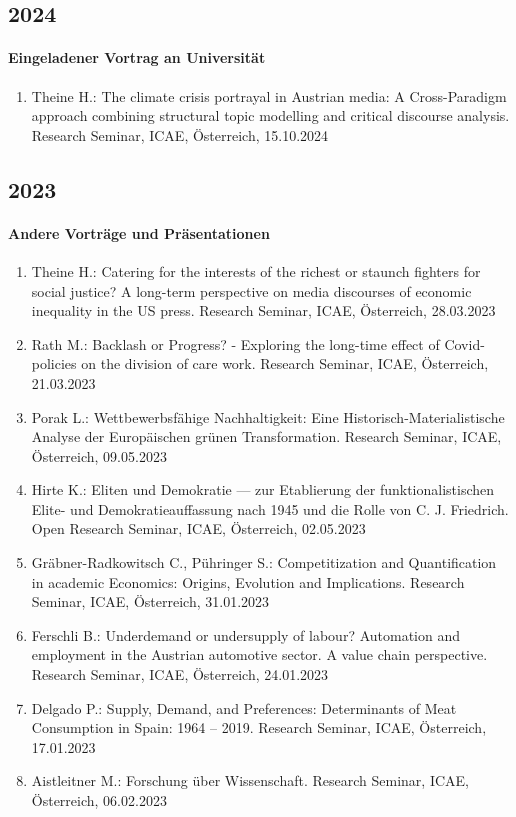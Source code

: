\subsection*{2024}

    \paragraph{Eingeladener Vortrag an Universität}
\begin{enumerate}
	\item Theine H.: The climate crisis portrayal in Austrian media:  A Cross-Paradigm approach combining structural topic modelling and critical discourse analysis. Research Seminar, ICAE, Österreich, 15.10.2024
\end{enumerate}
\subsection*{2023}

    \paragraph{Andere Vorträge und Präsentationen}
\begin{enumerate}
	\item Theine H.: Catering for the interests of the richest or staunch fighters for social justice? A long-term perspective on media discourses of economic inequality in the US press. Research Seminar, ICAE, Österreich, 28.03.2023
	\item Rath M.: Backlash or Progress? - Exploring the long-time effect of Covid-policies on the division of care work. Research Seminar, ICAE, Österreich, 21.03.2023
	\item Porak L.: Wettbewerbsfähige Nachhaltigkeit: Eine Historisch-Materialistische Analyse der Europäischen grünen Transformation. Research Seminar, ICAE, Österreich, 09.05.2023
	\item Hirte K.: Eliten und Demokratie — zur Etablierung der funktionalistischen Elite- und Demokratieauffassung nach 1945 und die Rolle von C. J. Friedrich. Open Research Seminar, ICAE, Österreich, 02.05.2023
	\item Gräbner-Radkowitsch C., Pühringer S.: Competitization and Quantification in academic Economics: Origins, Evolution and Implications. Research Seminar, ICAE, Österreich, 31.01.2023
	\item Ferschli B.: Underdemand or undersupply of labour? Automation and employment in the Austrian automotive sector. A value chain perspective. Research Seminar, ICAE, Österreich, 24.01.2023
	\item Delgado P.: Supply, Demand, and Preferences: Determinants of Meat Consumption in Spain: 1964 – 2019. Research Seminar, ICAE, Österreich, 17.01.2023
	\item Aistleitner M.: Forschung über Wissenschaft. Research Seminar, ICAE, Österreich, 06.02.2023
\end{enumerate}
